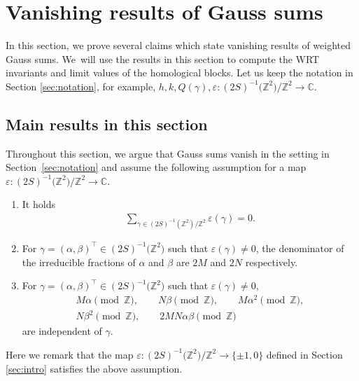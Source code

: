 \documentclass[11pt]{article}
\numberwithin{equation}{section}
\newcommand{\veps}{\varepsilon}
\newcommand{\Z}{\mathbb{Z}}
\newcommand{\bbC}{\mathbb{C}}
\numberwithin{equation}{section}
\newcommand{\trans}[1]{#1^\top}
\begin{document}
\section{Vanishing results of Gauss sums} \label{sec:Gauss_sum}

In this section, we prove several claims which state vanishing results of weighted Gauss sums.
We~will use the results in this section to compute the WRT invariants and limit values of the homological blocks.
Let us keep the notation in Section \ref{sec:notation}, for example, $ h, k, Q(\gamma), \veps \colon (2S)^{-1}\big(\Z^2\big)/\allowbreak\Z^2 \to \bbC $.


\subsection{Main results in this section} %

Throughout this section, we argue that Gauss sums vanish in the setting in Section~\ref{sec:notation} and assume the following assumption for a map $ \veps \colon (2S)^{-1}\big(\Z^2\big)/\Z^2 \to \bbC $.

\begin{assump}\qquad \label{assump:Gauss_sum}
	\begin{enumerate}
		\item[$(i)$] %
		It holds
		\begin{gather*}
		\sum_{\gamma \in (2S)^{-1}(\Z^2)/\Z^2} \veps(\gamma) = 0.
		\end{gather*}
		\item[$(ii)$] %
		For $ \gamma = \trans{(\alpha, \beta)} \in (2S)^{-1}\big(\Z^2\big) $ such that $ \veps(\gamma) \neq 0 $, the denominator of the irreducible fractions of $ \alpha $ and $ \beta $ are $ 2M $ and $ 2N $ respectively.
		\item[$(iii)$] %
		For $ \gamma = \trans{(\alpha, \beta)} \in (2S)^{-1}\big(\Z^2\big) $ such that $ \veps(\gamma) \neq 0 $,
		\begin{gather*}
		M\alpha \pmod \Z, \qquad
		N\beta \pmod \Z, \qquad
		M\alpha^2 \pmod \Z,
\\
		N\beta^2 \pmod \Z, \qquad
		2MN\alpha \beta \pmod \Z
		\end{gather*}
		are independent of $ \gamma $.
	\end{enumerate}
\end{assump}

Here we remark that the map $ \veps \colon (2S)^{-1}\big(\Z^2\big)/\Z^2 \to \{ \pm1, 0 \} $ defined in Section \ref{sec:intro} satisfies the above assumption.
\end{document}
